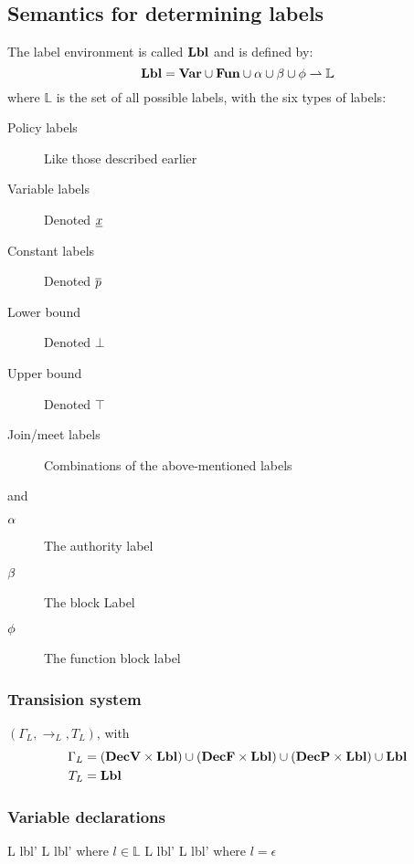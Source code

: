 \subsection{Semantics for determining labels}
The label environment is called $\mathbf{Lbl}$ and is defined by:
\[
  \mathbf{Lbl} = \mathbf{Var} \cup \mathbf{Fun} \cup \alpha \cup \beta \cup \phi \rightharpoonup \mathbb{L}
\]
where $\mathbb{L}$ is the set of all possible labels, with the six types of labels:
\begin{description}
  \item[Policy labels] Like those described earlier
  \item[Variable labels] Denoted $\underline{x}$
  \item[Constant labels] Denoted $\overline{p}$
  \item[Lower bound] Denoted $\bot$
  \item[Upper bound] Denoted $\top$
  \item[Join/meet labels] Combinations of the above-mentioned labels
\end{description}

and

\begin{description}
  \item[$\alpha$] The authority label
  \item[$\beta$] The block Label
  \item[$\phi$] The function block label
\end{description}

\subsubsection{Transision system}
$(\Gamma_{L}, \rightarrow_{L}, T_{L})$, with
\begin{align*}
  \Gamma_{L} & = (\mathbf{DecV} \times \mathbf{Lbl}) \cup (\mathbf{DecF} \times \mathbf{Lbl}) \cup (\mathbf{DecP} \times \mathbf{Lbl}) \cup \mathbf{Lbl} \\
  T_{L} & = \mathbf{Lbl}
\end{align*}

\subsubsection{Variable declarations}

\begin{trules}
        { {L} {lbl'} }
        { {L} {lbl'} }
        {where $l \in \mathbb{L}$}
        { {L} {lbl'} }
        { {L} {lbl'} }
        {where $l = \epsilon$}
\end{trules}

